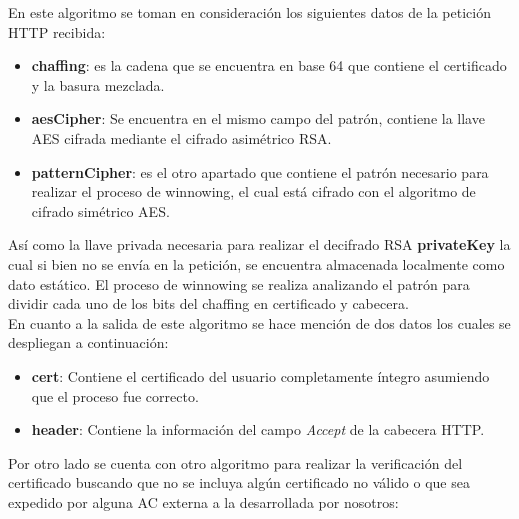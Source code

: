 \documentclass[12pt, a4paper, titlepage]{report}
\begin{document}
                 En este algoritmo se toman en consideración los siguientes datos de la petición HTTP recibida:
                    \begin{itemize}
                        \item \textbf{chaffing}: es la cadena que se encuentra en base 64 que contiene el certificado y la basura mezclada.
                        \item \textbf{aesCipher}: Se encuentra en el mismo campo del patrón, contiene la llave AES cifrada mediante el cifrado asimétrico RSA.
                        \item \textbf{patternCipher}: es el otro apartado que contiene el patrón necesario para realizar el proceso de winnowing, el cual está cifrado con el algoritmo de cifrado simétrico AES.
                        
                    \end{itemize}
                Así como la llave privada necesaria para realizar el decifrado RSA \textbf{privateKey} la cual si bien no se envía en la petición, se encuentra almacenada localmente como dato estático. El proceso de winnowing se realiza analizando el patrón para dividir cada uno de los bits del chaffing en certificado y cabecera.\\
                En cuanto a la salida de este algoritmo se hace mención de dos datos los cuales se despliegan a continuación:
                \begin{itemize}
                    \item \textbf{cert}: Contiene el certificado del usuario completamente íntegro asumiendo que el proceso fue correcto.
                    \item \textbf{header}: Contiene la información del campo \textit{Accept} de la cabecera HTTP.
                    
                \end{itemize}

               
                Por otro lado se cuenta con otro algoritmo para realizar la verificación del certificado buscando que no se incluya algún certificado no válido o que sea expedido por alguna AC externa a la desarrollada por nosotros:
                
\end{document}
